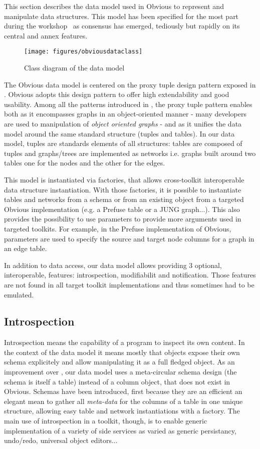 This section describes the data model used in Obvious to represent and manipulate data structures.
This model has been  specified for the most part during the workshop~\cite{vismaster2008} as consensus has emerged, tediously but rapidly on its central and annex features.

\begin{figure}[!ht]
\texttt{[image: figures/obviousdataclass]}
\caption{Class diagram of the data model}
\label{fig:datamodel}
\end{figure}

The Obvious data model is centered on the proxy tuple design pattern exposed in \cite{DesignPatternsIV}. Obvious adopts this design pattern to offer high extendability and good usability. Among all the patterns introduced in \cite{DesignPatternsIV}, the proxy tuple pattern enables both as it encompasses graphs in an object-oriented manner - many developers are used to manipulation of \emph{object oriented graphs} - and as it unifies the data model around the same standard structure (tuples and tables). In our data model, tuples are standards elements of all structures: tables are composed of tuples and graphs/trees are implemented as networks i.e. graphs built around two tables one for the nodes and the other for the edges. 

This model is instantiated via factories, that allows cross-toolkit interoperable data structure instantiation. With those factories, it is possible to instantiate tables and networks from a schema or from an existing object from a targeted Obvious implementation (e.g. a Prefuse table or a JUNG graph...). This also provides the possibility to use parameters to provide more arguments used in targeted toolkits. For example, in the Prefuse implementation of Obvious, parameters are used to specify the source and target node columns for a graph in an edge table.

In addition to data access, our data model allows providing 3 optional, interoperable, features: introspection, modifiabilit and notification. Those features are not found in all target toolkit implementations and thus sometimes had to be emulated.
 
\subsection{Introspection}

Introspection means the capability of a program to inspect its own content. In the context of the data model it means mostly that objects expose their own schema explicitely and allow manipulating it as a full fledged object. As an improvement over \cite{DesignPatternsIV}, our data model uses a meta-circular schema design (the schema is itself a table) instead of a column object, that does not exist in Obvious. Schemas have been introduced, first because they are an efficient an elegant mean to gather all \emph{meta-data} for the columns of a table in one unique structure, allowing easy table and network instantiations with a factory. The main use of introspection in a toolkit, though, is to enable generic implementation of a variety of side services as varied as generic persistancy, undo/redo, universal object editors...

